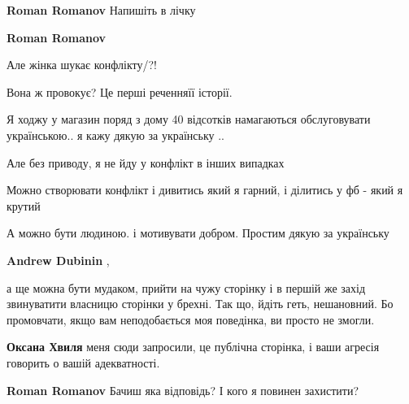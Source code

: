 \begin{itemize}
\begin{itemize}
\textbf{Roman Romanov} Напишіть в лічку

 
\textbf{Roman Romanov} 

Але жінка шукає конфлікту/?!

Вона ж провокує? Це перші реченняїї історії.

Я ходжу у магазин поряд з дому 40 відсотків намагаються обслуговувати
українською.. я кажу дякую за українську ..

Але без приводу, я не йду у конфлікт в інших випадках

Можно створювати конфлікт і дивитись який я гарний, і ділитись у фб - який я
крутий

А можно бути людиною. і мотивувати добром. Простим дякую за українську

 
\textbf{Andrew Dubinin} , 

а ще можна бути мудаком, прийти на чужу сторінку і в першій же захід
звинуватити власницю сторінки у брехні. Так що, йдіть геть, нешановний. Бо
промовчати, якщо вам неподобається моя поведінка, ви просто не змогли.

 
\textbf{Оксана Хвиля} меня сюди запросили, це публічна сторінка, і ваши агресія говорить о вашій адекватності.

 
\textbf{Roman Romanov} Бачиш яка відповідь?
І кого я повинен захистити?

 

\end{itemize}
\end{itemize}
